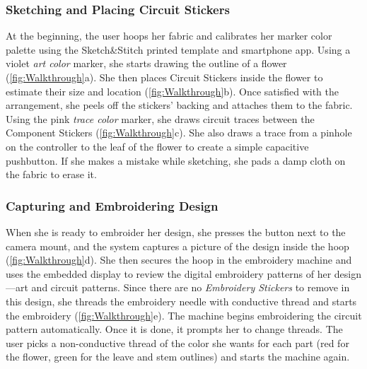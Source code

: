 \documentclass[header.tex]{subfiles}
\begin{document}
\subsubsection{Sketching and Placing Circuit Stickers}
At the beginning, the user hoops her fabric and calibrates her marker color palette using the Sketch\&Stitch printed template and smartphone app.
Using a violet \textit{art color} marker, she starts drawing the outline of a flower (\ref{fig:Walkthrough}a). She then places Circuit Stickers inside the flower to estimate their size and location (\ref{fig:Walkthrough}b). Once satisfied with the arrangement, she peels off the stickers' backing and attaches them to the fabric. Using the pink \textit{trace color} marker, she draws circuit traces between the Component Stickers (\ref{fig:Walkthrough}c). She also draws a trace from a pinhole on the controller to the leaf of the flower to create a simple capacitive pushbutton. If she makes a mistake while sketching, she pads a damp cloth on the fabric to erase it.

\subsubsection{Capturing and Embroidering Design}
When she is ready to embroider her design, she presses the button next to the camera mount, and the system captures a picture of the design inside the hoop (\ref{fig:Walkthrough}d). She then secures the hoop in the embroidery machine and uses the embedded display to review the digital embroidery patterns of her design---art and circuit patterns. Since there are no \textit{Embroidery Stickers} to remove in this design, she threads the embroidery needle with conductive thread and starts the embroidery (\ref{fig:Walkthrough}e).  The machine begins embroidering the circuit pattern automatically. Once it is done, it prompts her to change threads. The user picks a non-conductive thread of the color she wants for each part (red for the flower, green for the leave and stem outlines) and starts the machine again. 

\end{document}
